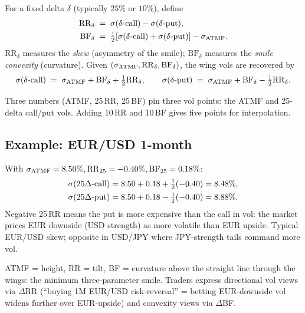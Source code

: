 \begin{keyfactbox}
\label{fact:fx_rr_bf}
For a fixed delta $\delta$ (typically $25\%$ or $10\%$), define
\begin{align}
  \mathrm{RR}_\delta
    &\;=\; \sigma(\delta\text{-call}) - \sigma(\delta\text{-put}),
    \label{eq:rr_def} \\
  \mathrm{BF}_\delta
    &\;=\; \tfrac12\!\left[\sigma(\delta\text{-call})
                            + \sigma(\delta\text{-put})\right]
           - \sigma_{\mathrm{ATMF}}.
    \label{eq:bf_def}
\end{align}
$\mathrm{RR}_\delta$ measures the \emph{skew} (asymmetry of the
smile); $\mathrm{BF}_\delta$ measures the \emph{smile convexity}
(curvature).  Given $(\sigma_{\mathrm{ATMF}}, \mathrm{RR}_\delta,
\mathrm{BF}_\delta)$, the wing vols are recovered by
\begin{equation}
  \sigma(\delta\text{-call}) \;=\;
    \sigma_{\mathrm{ATMF}} + \mathrm{BF}_\delta + \tfrac12\mathrm{RR}_\delta,
  \qquad
  \sigma(\delta\text{-put}) \;=\;
    \sigma_{\mathrm{ATMF}} + \mathrm{BF}_\delta - \tfrac12\mathrm{RR}_\delta.
  \label{eq:wing_vols}
\end{equation}
\end{keyfactbox}

Three numbers (ATMF, 25\,RR, 25\,BF) pin three vol points: the ATMF
and 25-delta call/put vols.  Adding 10\,RR and 10\,BF gives five
points for interpolation.

\subsection{Example: EUR/USD 1-month}

With $\sigma_{\mathrm{ATMF}} = 8.50\%, \mathrm{RR}_{25} = -0.40\%,
\mathrm{BF}_{25} = 0.18\%$:
\begin{align}
  \sigma(25\Delta\text{-call}) &= 8.50 + 0.18 + \tfrac12(-0.40)
                                = 8.48\%, \\
  \sigma(25\Delta\text{-put})  &= 8.50 + 0.18 - \tfrac12(-0.40)
                                = 8.88\%.
\end{align}
Negative 25\,RR means the put is more expensive than the call in
vol: the market prices EUR downside (USD strength) as more
volatile than EUR upside.  Typical EUR/USD skew; opposite in USD/JPY
where JPY-strength tails command more vol.

\begin{intuitionbox}
ATMF = height, RR = tilt, BF = curvature above the straight line
through the wings: the minimum three-parameter smile.  Traders
express directional vol views via $\Delta$RR (``buying 1M EUR/USD
risk-reversal'' = betting EUR-downside vol widens further over
EUR-upside) and convexity views via $\Delta$BF.
\end{intuitionbox}


